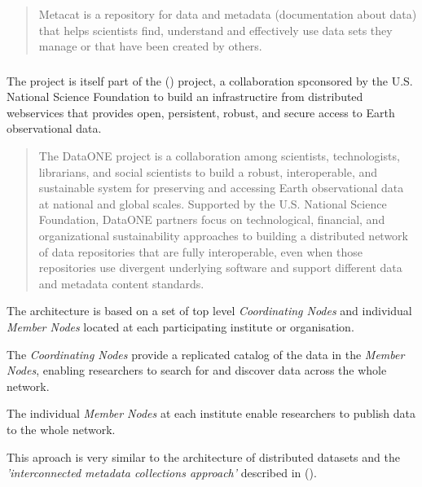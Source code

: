\documentclass{article}
\begin{document}
\begin{quote}
Metacat is a repository for data and metadata (documentation about data) that
helps scientists find, understand and effectively use data sets they manage or
that have been created by others.
\end{quote}

\subsubsection{}

The \cite{metacat} project is itself part of the
 (\cite{data.one})
project, a collaboration spconsored by the U.S. National Science Foundation to build
an infrastructire from distributed webservices that provides open, persistent, robust,
and secure access to Earth observational data.
 
\begin{quote}
The DataONE project is a collaboration among scientists, technologists,
librarians, and social scientists to build a robust, interoperable, and
sustainable system for preserving and accessing Earth observational data at
national and global scales. Supported by the U.S. National Science Foundation,
DataONE partners focus on technological, financial, and organizational
sustainability approaches to building a distributed network of data repositories
that are fully interoperable, even when those repositories use divergent
underlying software and support different data and metadata content standards.
\end{quote}

The \cite{data.one} architecture is based on a set of top level \textit{Coordinating Nodes}
and individual \textit{Member Nodes} located at each participating institute or organisation.

The \textit{Coordinating Nodes} provide a replicated catalog of the data in the
\textit{Member Nodes}, enabling researchers to search for and discover data across
the whole network.

The individual \textit{Member Nodes} at each institute enable researchers to publish data
to the whole \cite{data.one} network.

This aproach is very similar to the \cite{vo} architecture of distributed datasets
and the \textit{'interconnected metadata collections approach'} described in
 (\cite{jones-2006}).

\subsubsection{}
\end{document}
